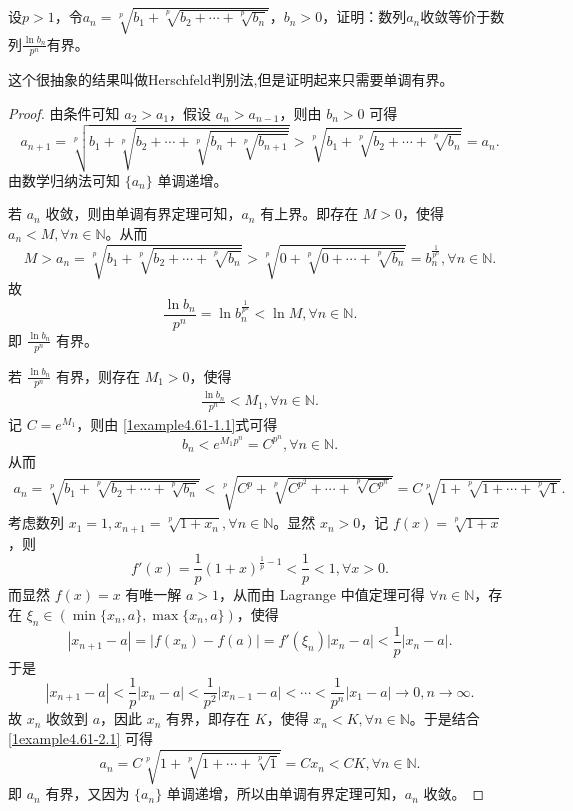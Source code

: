 \documentclass[../../main.tex]{subfiles}
\begin{document}
\begin{example}[$\,\,$Herschfeld判别法]\label{example:Herschfeld判别法}
设\(p > 1\)，令\(a_n=\sqrt[p]{b_1 + \sqrt[p]{b_2+\cdots+\sqrt[p]{b_n}}}\)，\(b_n>0\)，证明：数列\(a_n\)收敛等价于数列\(\frac{\ln b_n}{p^n}\)有界。
\end{example}
\begin{remark}
这个很抽象的结果叫做Herschfeld判别法,但是证明起来只需要单调有界。
\end{remark}
\begin{proof}
由条件可知 \(a_2 > a_1\)，假设 \(a_n > a_{n - 1}\)，则由 \(b_n > 0\) 可得
\[
a_{n + 1}=\sqrt[p]{b_1+\sqrt[p]{b_2+\cdots +\sqrt[p]{b_n+\sqrt[p]{b_{n + 1}}}}}>\sqrt[p]{b_1+\sqrt[p]{b_2+\cdots +\sqrt[p]{b_n}}}=a_n.
\]
由数学归纳法可知 \(\{ a_n \}\) 单调递增。

若 \(a_n\) 收敛，则由单调有界定理可知，\(a_n\) 有上界。即存在 \(M > 0\)，使得 \(a_n < M,\forall n\in \mathbb{N}\)。从而
\[
M > a_n=\sqrt[p]{b_1+\sqrt[p]{b_2+\cdots +\sqrt[p]{b_n}}}>\sqrt[p]{0+\sqrt[p]{0+\cdots +\sqrt[p]{b_n}}}=b_n^{\frac{1}{p^n}},\forall n\in \mathbb{N}.
\]
故
\[
\frac{\ln b_n}{p^n}=\ln b_n^{\frac{1}{p^n}}<\ln M,\forall n\in \mathbb{N}.
\]
即 \(\frac{\ln b_n}{p^n}\) 有界。

若 \(\frac{\ln b_n}{p^n}\) 有界，则存在 \(M_1 > 0\)，使得
\begin{align}
\frac{\ln b_n}{p^n}<M_1,\forall n\in \mathbb{N}. \label{1example4.61-1.1}
\end{align}
记 \(C = e^{M_1}\)，则由 \eqref{1example4.61-1.1}式可得
\[
b_n<e^{M_1p^n}=C^{p^n},\forall n\in \mathbb{N}.
\]
从而
\begin{align}
a_n=\sqrt[p]{b_1+\sqrt[p]{b_2+\cdots +\sqrt[p]{b_n}}}<\sqrt[p]{C^p+\sqrt[p]{C^{p^2}+\cdots +\sqrt[p]{C^{p^n}}}}=C\sqrt[p]{1+\sqrt[p]{1+\cdots +\sqrt[p]{1}}}. \label{1example4.61-2.1}
\end{align}
考虑数列 \(x_1 = 1,x_{n + 1}=\sqrt[p]{1 + x_n},\forall n\in \mathbb{N}\)。显然 \(x_n > 0\)，记 \(f(x)=\sqrt[p]{1 + x}\)，则
\[
f'(x)=\frac{1}{p}(1 + x)^{\frac{1}{p}-1}<\frac{1}{p}<1,\forall x > 0.
\]
而显然 \(f(x)=x\) 有唯一解 \(a > 1\)，从而由 Lagrange 中值定理可得 \(\forall n\in \mathbb{N}\)，存在 \(\xi_n\in(\min\{ x_n,a \},\max\{ x_n,a \})\)，使得
\[
|x_{n + 1}-a|=|f(x_n)-f(a)|=f'(\xi_n)|x_n - a|<\frac{1}{p}|x_n - a|.
\]
于是
\[
|x_{n + 1}-a|<\frac{1}{p}|x_n - a|<\frac{1}{p^2}|x_{n - 1}-a|<\cdots <\frac{1}{p^n}|x_1 - a|\rightarrow 0,n\rightarrow\infty.
\]
故 \(x_n\) 收敛到 \(a\)，因此 \(x_n\) 有界，即存在 \(K\)，使得 \(x_n < K,\forall n\in \mathbb{N}\)。于是结合 \eqref{1example4.61-2.1} 可得
\[
a_n=C\sqrt[p]{1+\sqrt[p]{1+\cdots +\sqrt[p]{1}}}=Cx_n<CK,\forall n\in \mathbb{N}.
\]
即 \(a_n\) 有界，又因为 \(\{ a_n \}\) 单调递增，所以由单调有界定理可知，\(a_n\) 收敛。

\end{proof}
\end{document}
